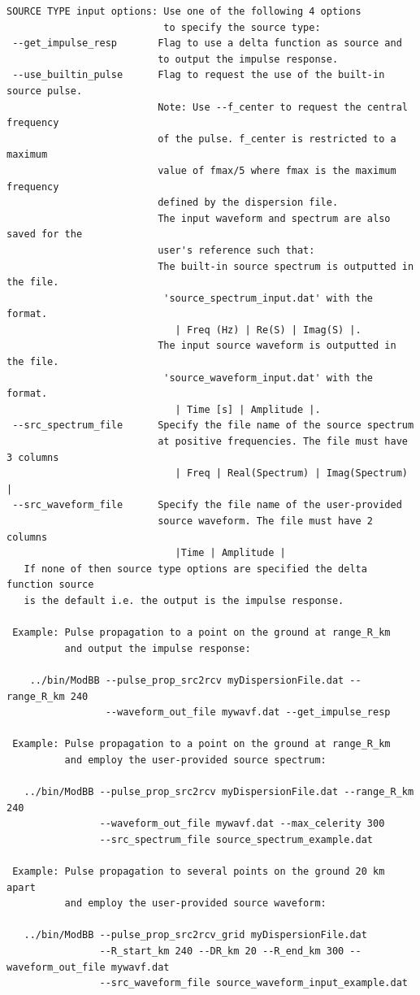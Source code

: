 \begin{verbatim}
SOURCE TYPE input options: Use one of the following 4 options
                           to specify the source type:
 --get_impulse_resp       Flag to use a delta function as source and
                          to output the impulse response.
 --use_builtin_pulse      Flag to request the use of the built-in source pulse.
                          Note: Use --f_center to request the central frequency
                          of the pulse. f_center is restricted to a maximum
                          value of fmax/5 where fmax is the maximum frequency
                          defined by the dispersion file.
                          The input waveform and spectrum are also saved for the
                          user's reference such that:
                          The built-in source spectrum is outputted in the file.
                           'source_spectrum_input.dat' with the format.
                             | Freq (Hz) | Re(S) | Imag(S) |.
                          The input source waveform is outputted in the file.
                           'source_waveform_input.dat' with the format.
                             | Time [s] | Amplitude |.
 --src_spectrum_file      Specify the file name of the source spectrum
                          at positive frequencies. The file must have 3 columns
                             | Freq | Real(Spectrum) | Imag(Spectrum) |
 --src_waveform_file      Specify the file name of the user-provided 
                          source waveform. The file must have 2 columns
                             |Time | Amplitude |
   If none of then source type options are specified the delta function source
   is the default i.e. the output is the impulse response.

 Example: Pulse propagation to a point on the ground at range_R_km
          and output the impulse response:

    ../bin/ModBB --pulse_prop_src2rcv myDispersionFile.dat --range_R_km 240 
                 --waveform_out_file mywavf.dat --get_impulse_resp

 Example: Pulse propagation to a point on the ground at range_R_km
          and employ the user-provided source spectrum:

   ../bin/ModBB --pulse_prop_src2rcv myDispersionFile.dat --range_R_km 240 
                --waveform_out_file mywavf.dat --max_celerity 300 
                --src_spectrum_file source_spectrum_example.dat

 Example: Pulse propagation to several points on the ground 20 km apart
          and employ the user-provided source waveform:

   ../bin/ModBB --pulse_prop_src2rcv_grid myDispersionFile.dat 
                --R_start_km 240 --DR_km 20 --R_end_km 300 --waveform_out_file mywavf.dat 
                --src_waveform_file source_waveform_input_example.dat

\end{verbatim}

